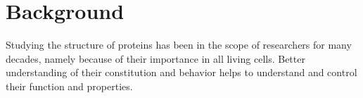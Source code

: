 \documentclass[twocolumn]{bmcart}%
\begin{document}
\begin{frontmatter}
\begin{abstractbox}
\begin{abstract}
\end{abstract}


\begin{keyword}
\end{keyword}


\end{abstractbox}
%

\end{frontmatter}



\section*{Background}
Studying the structure of proteins has been in the scope of researchers for many decades, namely because of their importance in all living cells. 
Better understanding of their constitution and behavior helps to understand and control their function and properties.
\end{document}
